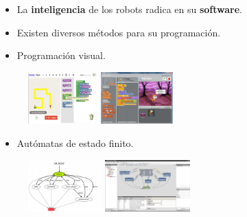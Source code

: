 \documentclass[notes,slidesec,a4]{seminar}
\begin{document}
\begin{hslide}
\begin{itemize}
\item La {\bf inteligencia} de los robots radica en su {\bf software}.
\item Existen diversos métodos para su programación.
\end{itemize}


\begin{minipage}[t]{0.5\textwidth}
\begin{center}
	\begin{itemize}
		\item Programación visual.
	\end{itemize}
	\begin{figure}
		\includegraphics[height=2cm]{imgs/blockly.png}
		\includegraphics[height=2cm]{imgs/scratch.jpg}
	\end{figure}
\end{center}
\end{minipage} \hfill
\begin{minipage}[t]{0.5\textwidth}
\begin{center}
	\begin{itemize}
		\item Autómatas de estado finito.
	\end{itemize}
	\begin{figure}
		\includegraphics[height=2cm]{imgs/smach.jpg}
		\includegraphics[height=2cm]{imgs/xaitControl.jpg}
	\end{figure}
\end{center}
\end{minipage}

\end{hslide}
\end{document}
